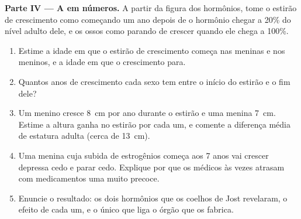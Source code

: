 \begin{problem}
\medskip
\noindent\textbf{Parte IV --- A  em números.}
A partir da figura dos hormônios, tome o estirão de crescimento como
começando um ano depois de o hormônio chegar a 20\% do nível adulto
dele, e os ossos como parando de crescer quando ele chega a 100\%.
\begin{enumerate}[resume]
  \item Estime a idade em que o estirão de crescimento começa nas
        meninas e nos meninos, e a idade em que o crescimento para.
  \item Quantos anos de crescimento cada sexo tem entre o início do
        estirão e o fim dele?
  \item Um menino cresce \qty{8}{cm} por ano durante o estirão e uma
        menina \qty{7}{cm}. Estime a altura ganha no estirão por cada
        um, e comente a diferença média de estatura adulta (cerca de
        \qty{13}{cm}).
  \item Uma menina cuja subida de estrogênios começa aos 7 anos vai
        crescer depressa cedo e parar cedo. Explique por que os médicos
        às vezes atrasam com medicamentos uma  muito precoce.
  \item Enuncie o resultado: os dois hormônios que os coelhos de Jost
        revelaram, o efeito de cada um, e o único  que liga o órgão
        que os fabrica.
\end{enumerate}
\end{problem}
